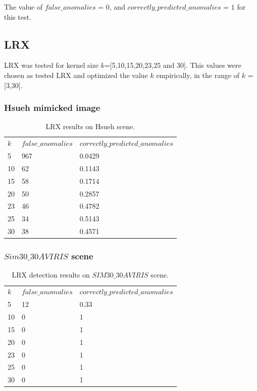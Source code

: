 The value of $false\_anomalies$ = 0, and  $correctly\_predicted\_anomalies$ = $1$ for this test.

\subsection{LRX}
LRX was tested for kernel size $k$=[5,10,15,20,23,25 and 30]. This values were chosen as  \cite{global_and_local_rx} tested LRX and optimized the value $k$ empirically, in the range of $k$ =[3,30]. 

\subsubsection{Hsueh mimicked image}

 \begin{table}[H]
\centering
 \resizebox{1.1\textwidth}{!}
{\begin{tabular}{l|l|l}
\textbf{$k$} & $false\_anomalies$ & $correctly\_predicted\_anomalies$\\
5 & 967 &0.0429 \\
10 & 62&0.1143 \\
15 & 58&0.1714 \\
20 & 50& 0.2857\\
23 &46 &0.4782 \\
25 &34 & 0.5143\\
30 & 38& 0.4571\\

\end{tabular}}
\caption{LRX results on Hsueh scene.}
\label{tab:LRX_Hsueh}
\end{table}



\subsubsection{$Sim30\_30 AVIRIS$ scene}
 \begin{table}[H]
\centering
 \resizebox{1.1\textwidth}{!}
{\begin{tabular}{l|l|l}
\textbf{$k$} & $false\_anomalies$ & $correctly\_predicted\_anomalies$\\
5 &12 &0.33 \\
10 &0 &1 \\
15 & 0&1 \\
20 & 0&1 \\
23 &0 &1 \\
25 &0 &1 \\
30 & 0&1 \\

\end{tabular}}
\caption{LRX detection results on $SIM30\_30AVIRIS$ scene.}
\label{tab:LRX}

\end{table}

